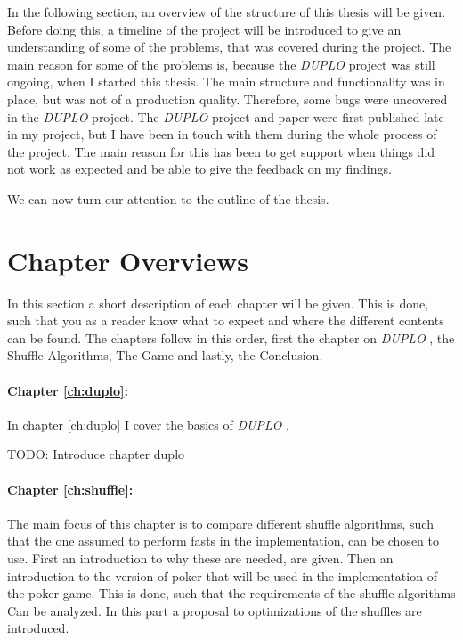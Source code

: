 \documentclass[twoside,11pt,openright]{report}
\newcommand{\todo}[1]{}
\renewcommand{\todo}[1]{{\color{red} TODO: {#1}} \\}
\newcommand{\DUPLO}{\textit{DUPLO} }
\begin{document}
\bigskip

In the following section, an overview of the structure of this thesis will be given. Before doing this, a timeline of the project will be introduced to give an understanding of some of the problems, that was covered during the project. The main reason for some of the problems is, because the \DUPLO project was still ongoing, when I started this thesis. The main structure and functionality was in place, but was not of a production quality. Therefore, some bugs were uncovered in the \DUPLO project. The \DUPLO project and paper were first published late in my project, but I have been in touch with them during the whole process of the project. The main reason for this has been to get support when things did not work as expected and be able to give the feedback on my findings.

We can now turn our attention to the outline of the thesis.


\section{Chapter Overviews}
\label{ch:overview}
In this section a short description of each chapter will be given. This is done, such that you as a reader know what to expect and where the different contents can be found. The chapters follow in this order, first the chapter on \DUPLO, the Shuffle Algorithms, The Game and lastly, the Conclusion.

\paragraph{Chapter \ref{ch:duplo}:}
In chapter \ref{ch:duplo} I cover the basics of \DUPLO. 

\todo{Introduce chapter duplo}

\paragraph{Chapter \ref{ch:shuffle}:}
The main focus of this chapter is to compare different shuffle algorithms, such that the one assumed to perform fasts in the implementation, can be chosen to use. First an introduction to why these are needed, are given. Then an introduction to the version of poker that will be used in the implementation of the poker game. This is done, such that the requirements of the shuffle algorithms Can be analyzed. In this part a proposal to optimizations of the shuffles are introduced. 
\end{document}
